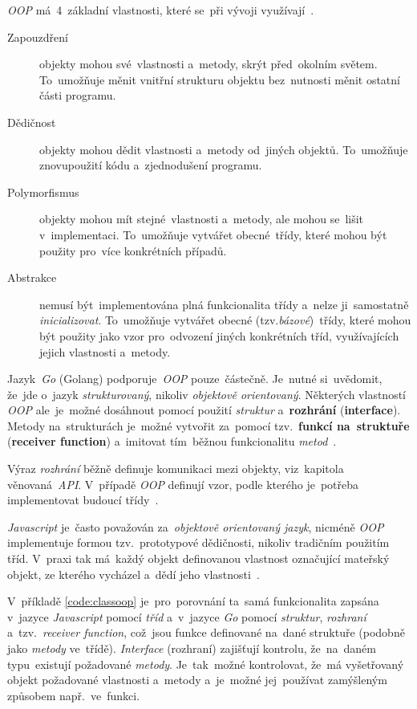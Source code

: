 \documentclass[11pt,a4paper]{report}
\begin{document}
            \emph{OOP} má~4~základní vlastnosti, které se~při vývoji využívají~\cite{Keogh:OOP}.
            \begin{description}
                \item[Zapouzdření] objekty mohou své~vlastnosti a~metody, skrýt před~okolním světem. To~umožňuje měnit vnitřní strukturu objektu bez~nutnosti měnit ostatní části programu.
                \item[Dědičnost] objekty mohou dědit vlastnosti a~metody od~jiných objektů. To~umožňuje znovupoužití kódu a~zjednodušení programu.
                \item[Polymorfismus] objekty mohou mít stejné~vlastnosti a~metody, ale mohou se~lišit v~implementaci. To~umožňuje vytvářet obecné~třídy, které mohou být použity pro~více konkrétních případů.
                \item[Abstrakce] nemusí být~implementována plná funkcionalita třídy a~nelze ji~samostatně \emph{inicializovat}. To~umožňuje vytvářet obecné (tzv.\emph{bázové})~třídy, které mohou být použity jako vzor pro~odvození jiných konkrétních tříd, využívajících jejich vlastnosti a~metody.
            \end{description}

            Jazyk~\emph{Go} (Golang) podporuje~\emph{OOP} pouze~částečně. Je~nutné si~uvědomit, že~jde o~jazyk \emph{strukturovaný}, nikoliv \emph{objektově orientovaný}. Některých vlastností \emph{OOP} ale~je~možné dosáhnout pomocí použití \emph{struktur} a~\textbf{rozhrání} (\textbf{interface}). Metody na~strukturách je~možné vytvořit za~pomocí tzv.~\textbf{funkcí na~struktuře} (\textbf{receiver function}) a~imitovat tím~běžnou funkcionalitu \emph{metod}~\cite{go:OOP, Scott2019:programmingpragmatics}.

            Výraz \emph{rozhrání} běžně definuje komunikaci mezi objekty, viz~kapitola věnovaná~\emph{API}. V~případě \emph{OOP} definují vzor, podle kterého je~potřeba implementovat budoucí třídy~\cite{go:OOP}.
            
            \emph{Javascript} je~často považován za~\emph{objektově orientovaný jazyk}, nicméně \emph{OOP} implementuje formou tzv.~prototypové dědičnosti, nikoliv tradičním použitím tříd. V~praxi tak má~každý objekt definovanou vlastnost označující mateřský objekt, ze kterého vycházel a~dědí jeho vlastnosti~\cite[2.1.01]{kantor_javascript, Scott2019:programmingpragmatics}.
            
            V~příkladě \ref{code:classoop} je~pro~porovnání ta~samá funkcionalita zapsána v~jazyce \emph{Javascript} pomocí \emph{tříd} a~v~jazyce \emph{Go} pomocí \emph{struktur}, \emph{rozhraní} a~tzv.~\emph{receiver function}, což~jsou funkce definované na~dané struktuře (podobně jako \emph{metody} ve~třídě). \emph{Interface} (rozhraní) zajišťují kontrolu, že~na~daném typu~existují požadované \emph{metody}. Je~tak~možné kontrolovat, že~má vyšetřovaný objekt požadované vlastnosti a~metody a~je~možné jej~používat zamýšleným způsobem např.~ve~funkci.~\cite{go:OOP}
\end{document}
